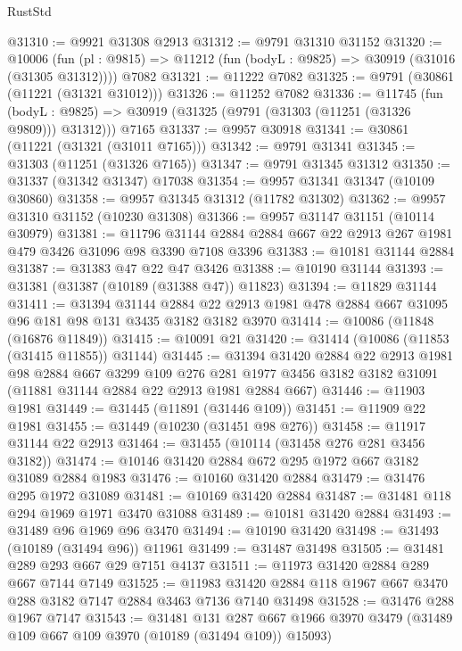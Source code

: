 \begin{lexlean}{RustStd}
\begin{coremodule}
@31310 := @9921 @31308 @2913
@31312 := @9791 @31310 @31152
@31320 := @10006
    (fun (pl : @9815) => @11212 (fun (bodyL : @9825) => @30919 (@31016 (@31305 @31312))))
    @7082
@31321 := @11222 @7082
@31325 := @9791 (@30861 (@11221 (@31321 @31012)))
@31326 := @11252 @7082
@31336 := @11745
    (fun (bodyL : @9825) => @30919 (@31325 (@9791 (@31303 (@11251 (@31326 @9809))) @31312)))
    @7165
@31337 := @9957 @30918
@31341 := @30861 (@11221 (@31321 (@31011 @7165)))
@31342 := @9791 @31341
@31345 := @31303 (@11251 (@31326 @7165))
@31347 := @9791 @31345 @31312
@31350 := @31337 (@31342 @31347) @17038
@31354 := @9957 @31341 @31347 (@10109 @30860)
@31358 := @9957 @31345 @31312 (@11782 @31302)
@31362 := @9957 @31310 @31152 (@10230 @31308)
@31366 := @9957 @31147 @31151 (@10114 @30979)
@31381 := @11796
    @31144
    @2884
    @2884
    @667
    @22
    @2913
    @267
    @1981
    @479
    @3426
    @31096
    @98
    @3390
    @7108
    @3396
@31383 := @10181 @31144 @2884
@31387 := @31383 @47 @22 @47 @3426
@31388 := @10190 @31144
@31393 := @31381 (@31387 (@10189 (@31388 @47)) @11823)
@31394 := @11829 @31144
@31411 := @31394
    @31144
    @2884
    @22
    @2913
    @1981
    @478
    @2884
    @667
    @31095
    @96
    @181
    @98
    @131
    @3435
    @3182
    @3182
    @3970
@31414 := @10086 (@11848 (@16876 @11849))
@31415 := @10091 @21
@31420 := @31414 (@10086 (@11853 (@31415 @11855)) @31144)
@31445 := @31394
    @31420
    @2884
    @22
    @2913
    @1981
    @98
    @2884
    @667
    @3299
    @109
    @276
    @281
    @1977
    @3456
    @3182
    @3182
    @31091
    (@11881 @31144 @2884 @22 @2913 @1981 @2884 @667)
@31446 := @11903 @1981
@31449 := @31445 (@11891 (@31446 @109))
@31451 := @11909 @22 @1981
@31455 := @31449 (@10230 (@31451 @98 @276))
@31458 := @11917 @31144 @22 @2913
@31464 := @31455 (@10114 (@31458 @276 @281 @3456 @3182))
@31474 := @10146 @31420 @2884 @672 @295 @1972 @667 @3182 @31089 @2884 @1983
@31476 := @10160 @31420 @2884
@31479 := @31476 @295 @1972 @31089
@31481 := @10169 @31420 @2884
@31487 := @31481 @118 @294 @1969 @1971 @3470 @31088
@31489 := @10181 @31420 @2884
@31493 := @31489 @96 @1969 @96 @3470
@31494 := @10190 @31420
@31498 := @31493 (@10189 (@31494 @96)) @11961
@31499 := @31487 @31498
@31505 := @31481 @289 @293 @667 @29 @7151 @4137
@31511 := @11973 @31420 @2884 @289 @667 @7144 @7149
@31525 := @11983 @31420 @2884 @118 @1967 @667 @3470 @288 @3182 @7147 @2884 @3463 @7136 @7140 @31498
@31528 := @31476 @288 @1967 @7147
@31543 := @31481
    @131
    @287
    @667
    @1966
    @3970
    @3479
    (@31489 @109 @667 @109 @3970 (@10189 (@31494 @109)) @15093)

\end{coremodule}
\end{lexlean}
